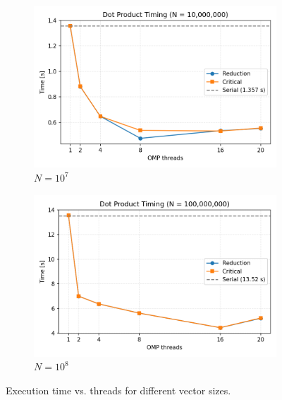 \begin{figure}[H]
    \begin{subfigure}{0.45\textwidth}
        \centering
        \includegraphics[width=\linewidth]{../Skeleton_codes/dotProduct/plots/dotprod_N10000000.png}
        \caption{$N = 10^7$}
        \label{fig:dotprod_n1e7}
    \end{subfigure}
    \hfill
    \begin{subfigure}{0.45\textwidth}
        \centering
        \includegraphics[width=\linewidth]{../Skeleton_codes/dotProduct/plots/dotprod_N100000000.png}
        \caption{$N = 10^8$}
        \label{fig:dotprod_n1e8}
    \end{subfigure}
    \caption{Execution time vs. threads for different vector sizes.}
\end{figure}

